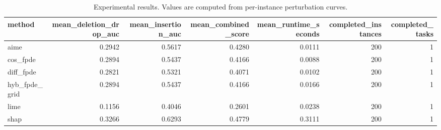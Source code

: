 \begin{table}[t]
\caption{Experimental results. Values are computed from per-instance perturbation curves.}
\label{tab:main_results_computed}
\centering
\begin{tabular}{lrrrrrr}
\toprule
method & mean\_deletion\_drop\_auc & mean\_insertion\_auc & mean\_combined\_score & mean\_runtime\_seconds & completed\_instances & completed\_tasks \\
\midrule
aime & 0.2942 & 0.5617 & 0.4280 & 0.0111 & 200 & 1 \\
cos\_fpde & 0.2894 & 0.5437 & 0.4166 & 0.0088 & 200 & 1 \\
diff\_fpde & 0.2821 & 0.5321 & 0.4071 & 0.0102 & 200 & 1 \\
hyb\_fpde\_grid & 0.2894 & 0.5437 & 0.4166 & 0.0166 & 200 & 1 \\
lime & 0.1156 & 0.4046 & 0.2601 & 0.0238 & 200 & 1 \\
shap & 0.3266 & 0.6293 & 0.4779 & 0.3111 & 200 & 1 \\
\bottomrule
\end{tabular}

\end{table}
